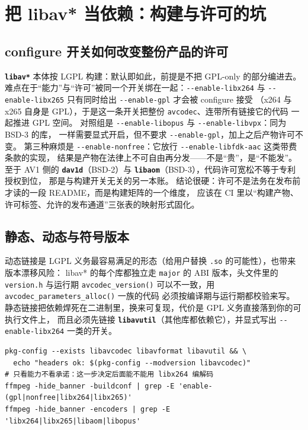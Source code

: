 \documentclass[12pt,a4paper,fontset=fandol]{ctexbook}
\newcommand{\Fn}[1]{\texttt{#1()}}
\newcommand{\Tp}[1]{\texttt{#1}}
\newcommand{\Opt}[1]{\texttt{-\/-#1}}
\newcommand{\Bk}{\discretionary{}{}{}}
\newcommand{\Lib}[1]{\textbf{\texttt{#1}}}
\begin{document}
\section{把 libav* 当依赖：构建与许可的坑}

\subsection*{configure 开关如何改变整份产品的许可}
\Lib{libav*} 本体按 LGPL 构建：默认即如此，前提是不把 GPL-only 的部分编进去。
难点在于``能力''与``许可''被同一个开关绑在一起：\Opt{enable-{\Bk}libx264} 与
\Opt{enable-{\Bk}libx265} 只有同时给出 \Opt{enable-{\Bk}gpl} 才会被 configure 接受
（x264 与 x265 自身是 GPL），于是这一条开关把整份 \Tp{avcodec}、连带所有链接它的代码
一起推进 GPL 空间。
对照组是 \Opt{enable-{\Bk}libopus} 与 \Opt{enable-{\Bk}libvpx}：同为 BSD-3 的库，
一样需要显式开启，但不要求 \Opt{enable-{\Bk}gpl}，加上之后产物许可不变。
第三种麻烦是 \Opt{enable-{\Bk}nonfree}：它放行 \Opt{enable-{\Bk}libfdk-{\Bk}aac} 这类带费条款的实现，
结果是产物在法律上不可自由再分发——不是``贵''，是``不能发''。
至于 AV1 侧的 \Lib{dav1d}（BSD-2）与 \Lib{libaom}（BSD-3），代码许可宽松不等于专利授权到位，
那是与构建开关无关的另一本账。
结论很硬：许可不是法务在发布前才读的一段 README，而是构建矩阵的一个维度，
应该在 CI 里以``构建产物、许可标签、允许的发布通道''三张表的映射形式固化。

\subsection*{静态、动态与符号版本}
动态链接是 LGPL 义务最容易满足的形态（给用户替换 \Tp{.{\Bk}so} 的可能性），也带来版本漂移风险：
libav* 的每个库都独立走 \Tp{major} 的 ABI 版本，头文件里的 \Tp{version.{\Bk}h} 与运行期
\Fn{avcodec\_{\Bk}version} 可以不一致，用 \Fn{avcodec\_{\Bk}parame{\Bk}ters\_{\Bk}alloc} 一族的代码
必须按编译期与运行期都校验来写。
静态链接把依赖焊死在二进制里，换来可复现，代价是 GPL 义务直接落到你的可执行文件上，
而且必须先链接 \Lib{libavutil}（其他库都依赖它），并显式写出 \Opt{enable-{\Bk}libx264} 一类的开关。

\begin{lstlisting}[style=shellstyle,caption={用 pkg-config 校验一个 GPL 构建是否真的可用},label={lst:ch13-pkgcheck}]
pkg-config --exists libavcodec libavformat libavutil && \
  echo "headers ok: $(pkg-config --modversion libavcodec)"
# 只看能力不看承诺：这一步决定后面能不能用 libx264 编解码
ffmpeg -hide_banner -buildconf | grep -E 'enable-(gpl|nonfree|libx264|libx265)'
ffmpeg -hide_banner -encoders | grep -E 'libx264|libx265|libaom|libopus'
\end{lstlisting}
\end{document}
